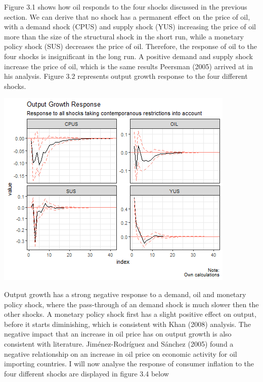 \documentclass[11pt,preprint, authoryear]{elsarticle}
\let\origfigure\figure
\let\endorigfigure\endfigure
\renewenvironment{figure}[1][2] {
    \expandafter\origfigure\expandafter[H]
} {
    \endorigfigure
}
\numberwithin{equation}{section}
\numberwithin{figure}{section}
\numberwithin{table}{section}
\begin{document}
Figure 3.1 shows how oil responds to the four shocks discussed in the
previous section. We can derive that no shock has a permanent effect on
the price of oil, with a demand shock (CPUS) and supply shock (YUS)
increasing the price of oil more than the size of the structural shock
in the short run, while a monetary policy shock (SUS) decreases the
price of oil. Therefore, the response of oil to the four shocks is
insignificant in the long run. A positive demand and supply shock
increase the price of oil, which is the same results Peersman (2005)
arrived at in his analysis. Figure 3.2 represents output growth response
to the four different shocks.

\begin{figure}[H]

{\centering \includegraphics{replication_files/figure-latex/Figure3-1} 

}

\caption{Response of Output growth\label{Figure3}}\label{fig:Figure3}
\end{figure}

Output growth has a strong negative response to a demand, oil and
monetary policy shock, where the pass-through of an demand shock is much
slower then the other shocks. A monetary policy shock first has a slight
positive effect on output, before it starts diminishing, which is
consistent with Khan (2008) analysis. The negative impact that an
increase in oil price has on output growth is also consistent with
literature. Jiménez-Rodríguez and Sánchez (2005) found a negative
relationship on an increase in oil price on economic activity for oil
importing countries. I will now analyse the response of consumer
inflation to the four different shocks are displayed in figure 3.4 below
\end{document}
